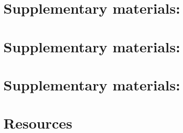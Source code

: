 \chapter{Supplementary materials: }
\label{appendix:supp:ratio}


\chapter{Supplementary materials: }
\label{appendix:supp:clones}


\chapter{Supplementary materials: }
\label{appendix:supp:metabolism}


\chapter{Resources}
\label{appendix:resources}



%

%

%
